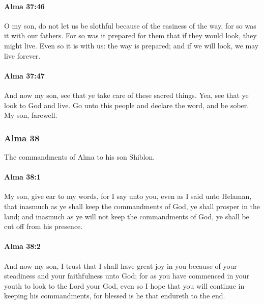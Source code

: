 		\paragraph{Alma 37:46} %
			\label{ALMA-37-46}

			O my son, do not let us be slothful because of the easiness of the way,
			for so was it with our fathers.
			For so was it prepared for them
			that if they would look, they might live.
			Even so it is with us:
			the way is prepared;
			and if we will look, we may live forever.

		\paragraph{Alma 37:47} %
			\label{ALMA-37-47}

			And now my son, see that ye take care of these sacred things.
			Yea, see that ye look to God and live.
			Go unto this people and declare the word,
			and be sober.
			My son, farewell.

	\subsubsection{Alma 38} %
		\label{ALMA-38}
		
		The commandments of Alma to his son Shiblon.
		
		\paragraph{Alma 38:1} %
			\label{ALMA-38-1}

			My son, give ear to my words,
			for I say unto you,
			even as I said unto Helaman,
			that inasmuch as ye shall keep the commandments of God,
			ye shall prosper in the land;
			and inasmuch as ye will not keep the commandments of God,
			ye shall be cut off from his presence.

		\paragraph{Alma 38:2} %
			\label{ALMA-38-2}

			And now my son, I trust that I shall have great joy in you
			because of your steadiness and your faithfulness unto God;
			for as you have commenced in your youth to look to the Lord your God,
			even so I hope that you will continue in keeping his commandments,
			for blessed is he that endureth to the end.

